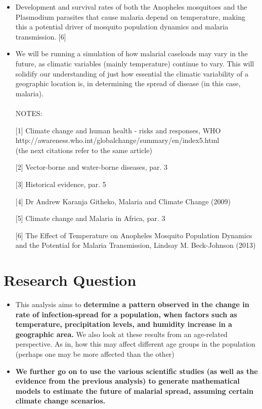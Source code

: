 \documentclass[fontsize=11pt]{article}
\begin{document}
\begin{itemize}
        \item Development and survival rates of both the Anopheles mosquitoes and the Plasmodium parasites that cause malaria depend on temperature, making this a potential driver of mosquito population dynamics and malaria transmission. [6]

        \item We will be running a simulation of how malarial caseloads may vary in the future, as climatic variables (mainly temperature) continue to vary. This will solidify our understanding of just how essential the climatic variability of a geographic location is, in determining the spread of disease (in this case, malaria).
        \\\\NOTES:

        [1] Climate change and human health - risks and responses, WHO  \\http://awareness.who.int/globalchange/summary/en/index5.html
        \\(the next citations refer to the same article)

        [2] Vector-borne and water-borne diseases, par. 3

        [3] Historical evidence, par. 5

        [4] Dr Andrew Karanja Githeko, Malaria and Climate Change (2009)

        [5] Climate change and Malaria in Africa, par. 3

        [6] The Effect of Temperature on Anopheles Mosquito Population Dynamics and the Potential for Malaria Transmission, Lindsay M. Beck-Johnson (2013)


    \end{itemize}
    \section*{Research Question}

    \begin{itemize}
        \large \item This analysis aims to \textbf {determine a pattern observed in the change in rate of infection-spread for a population, when factors such as temperature, precipitation levels, and humidity increase in a geographic area.} We also look at these results from an age-related perspective. As in, how this may affect different age groups in the population (perhaps one may be more affected than the other)

        \large \item \textbf{We further go on to use the various scientific studies (as well as the evidence from the previous analysis) to generate mathematical models to estimate the future of malarial spread, assuming certain climate change scenarios.}


    \end{itemize}
\end{document}
